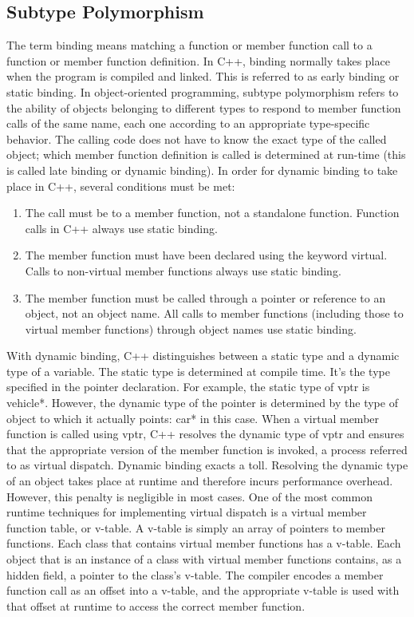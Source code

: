 \documentclass{report}
\begin{document}
    \subsection{Subtype Polymorphism}
    \bigbreak \noindent 
    The term binding means matching a function or member function call to a function or member function definition.
    \bigbreak \noindent 
    In C++, binding normally takes place when the program is compiled and linked. This is referred to as early binding or static binding.
    \bigbreak \noindent 
    In object-oriented programming, subtype polymorphism refers to the ability of objects belonging to different types to respond to member function calls of the same name, each one according to an appropriate type-specific behavior. The calling code does not have to know the exact type of the called object; which member function definition is called is determined at run-time (this is called late binding or dynamic binding).
    \bigbreak \noindent 
    In order for dynamic binding to take place in C++, several conditions must be met:
    \bigbreak \noindent 
    \begin{enumerate}
        \item The call must be to a member function, not a standalone function. Function calls in C++ always use static binding.
        \item The member function must have been declared using the keyword virtual. Calls to non-virtual member functions always use static binding.
        \item The member function must be called through a pointer or reference to an object, not an object name. All calls to member functions (including those to virtual member functions) through object names use static binding.
    \end{enumerate}
    \bigbreak \noindent 
    With dynamic binding, C++ distinguishes between a static type and a dynamic type of a variable. The static type is determined at compile time. It's the type specified in the pointer declaration. For example, the static type of vptr is vehicle*. However, the dynamic type of the pointer is determined by the type of object to which it actually points: car* in this case. When a virtual member function is called using vptr, C++ resolves the dynamic type of vptr and ensures that the appropriate version of the member function is invoked, a process referred to as virtual dispatch.
    \bigbreak \noindent 
    Dynamic binding exacts a toll. Resolving the dynamic type of an object takes place at runtime and therefore incurs performance overhead. However, this penalty is negligible in most cases.
    \bigbreak \noindent 
    One of the most common runtime techniques for implementing virtual dispatch is a virtual member function table, or v-table. A v-table is simply an array of pointers to member functions. Each class that contains virtual member functions has a v-table. Each object that is an instance of a class with virtual member functions contains, as a hidden field, a pointer to the class's v-table. The compiler encodes a member function call as an offset into a v-table, and the appropriate v-table is used with that offset at runtime to access the correct member function.
    \bigbreak \noindent 
\end{document}
